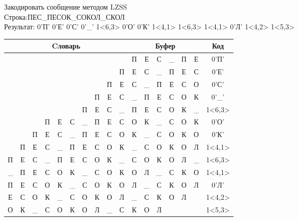 \documentclass[a4paper, 12pt]{article}
\begin{document}
Закодировать сообщение методом LZSS\\
Строка:ПЕС\_ПЕСОК\_СОКОЛ\_СКОЛ\\
Результат: 0'П' 0'Е' 0'С' 0'\_' 1<6,3> 0'О' 0'К' 1<4,1> 1<6,3> 1<4,1> 0'Л' 1<4,2> 1<5,3>\\
\begin{table}[h!]
\centering
\begin{tabular}{|c|c|c|c|c|c|c|c|c|c|c|c|c|c|c|c|c|}
\hline
\multicolumn{10}{|c|}{Cловарь} & \multicolumn{6}{c|}{Буфер} & Код  \\ \hline
  &   &   &   &   &   &   &   &   &   & П & Е & С & \_ & П & Е & 0'П'\\ \hline
  &   &   &   &   &   &   &   &   & П & Е & С & \_ & П & Е & С & 0'Е'\\ \hline
  &   &   &   &   &   &   &   & П & Е & С & \_ & П & Е & С & О & 0'С'\\ \hline
  &   &   &   &   &   &   & П & Е & С & \_ & П & Е & С & О & К & 0'\_'\\ \hline
  &   &   &   &   &   & \cellcolor[HTML]{FFFF00} П & \cellcolor[HTML]{FFFF00} Е & \cellcolor[HTML]{FFFF00} С & \_ & \cellcolor[HTML]{FFFF00} П & \cellcolor[HTML]{FFFF00} Е & \cellcolor[HTML]{FFFF00} С & О & К & \_ & 1<6,3>\\ \hline
  &   &   & П & Е & С & \_ & П & Е & С & О & К & \_ & С & О & К & 0'О'\\ \hline
  &   & П & Е & С & \_ & П & Е & С & О & К & \_ & С & О & К & О & 0'К'\\ \hline
  & П & Е & С & \cellcolor[HTML]{FFFF00} \_ & П & Е & С & О & К & \cellcolor[HTML]{FFFF00} \_ & С & О & К & О & Л & 1<4,1>\\ \hline
П & Е & С & \_ & П & Е & \cellcolor[HTML]{FFFF00} С & \cellcolor[HTML]{FFFF00} О & \cellcolor[HTML]{FFFF00} К & \_ & \cellcolor[HTML]{FFFF00} С & \cellcolor[HTML]{FFFF00} О & \cellcolor[HTML]{FFFF00} К & О & Л & \_ & 1<6,3>\\ \hline
\_ & П & Е & С & \cellcolor[HTML]{FFFF00} О & К & \_ & С & О & К & \cellcolor[HTML]{FFFF00} О & Л & \_ & С & К & О & 1<4,1>\\ \hline
П & Е & С & О & К & \_ & С & О & К & О & Л & \_ & С & К & О & Л & 0'Л'\\ \hline
Е & С & О & К & \cellcolor[HTML]{FFFF00} \_ & \cellcolor[HTML]{FFFF00} С & О & К & О & Л & \cellcolor[HTML]{FFFF00} \_ & \cellcolor[HTML]{FFFF00} С & К & О & Л &   & 1<4,2>\\ \hline
О & К & \_ & С & О & \cellcolor[HTML]{FFFF00} К & \cellcolor[HTML]{FFFF00} О & \cellcolor[HTML]{FFFF00} Л & \_ & С & \cellcolor[HTML]{FFFF00} К & \cellcolor[HTML]{FFFF00} О & \cellcolor[HTML]{FFFF00} Л &   &   &   & 1<5,3>\\ \hline
\end{tabular}
\end{table}
\end{document}
